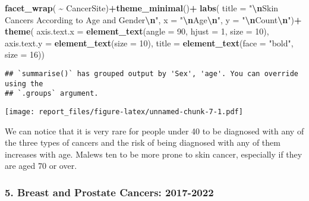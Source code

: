 \documentclass[
]{article}
\newenvironment{Shaded}{\begin{snugshade}}{\end{snugshade}}
\newcommand{\AttributeTok}[1]{\textcolor[rgb]{0.13,0.29,0.53}{#1}}
\newcommand{\DecValTok}[1]{\textcolor[rgb]{0.00,0.00,0.81}{#1}}
\newcommand{\FunctionTok}[1]{\textcolor[rgb]{0.13,0.29,0.53}{\textbf{#1}}}
\newcommand{\NormalTok}[1]{#1}
\newcommand{\SpecialCharTok}[1]{\textcolor[rgb]{0.81,0.36,0.00}{\textbf{#1}}}
\newcommand{\StringTok}[1]{\textcolor[rgb]{0.31,0.60,0.02}{#1}}
\begin{document}
\begin{Shaded}
\begin{Highlighting}[]
  \FunctionTok{facet\_wrap}\NormalTok{( }\SpecialCharTok{\textasciitilde{}}\NormalTok{ CancerSite)}\SpecialCharTok{+}\FunctionTok{theme\_minimal}\NormalTok{()}\SpecialCharTok{+}
  \FunctionTok{labs}\NormalTok{(}
    \AttributeTok{title =} \StringTok{"}\SpecialCharTok{\textbackslash{}n}\StringTok{Skin Cancers According to Age and Gender}\SpecialCharTok{\textbackslash{}n}\StringTok{"}\NormalTok{,}
    \AttributeTok{x =} \StringTok{"}\SpecialCharTok{\textbackslash{}n}\StringTok{Age}\SpecialCharTok{\textbackslash{}n}\StringTok{"}\NormalTok{, }
    \AttributeTok{y =} \StringTok{"}\SpecialCharTok{\textbackslash{}n}\StringTok{Count}\SpecialCharTok{\textbackslash{}n}\StringTok{"}\NormalTok{)}\SpecialCharTok{+}
  \FunctionTok{theme}\NormalTok{(}
    \AttributeTok{axis.text.x =} \FunctionTok{element\_text}\NormalTok{(}\AttributeTok{angle =} \DecValTok{90}\NormalTok{, }\AttributeTok{hjust =} \DecValTok{1}\NormalTok{, }\AttributeTok{size =} \DecValTok{10}\NormalTok{),}
  \AttributeTok{axis.text.y =} \FunctionTok{element\_text}\NormalTok{(}\AttributeTok{size =} \DecValTok{10}\NormalTok{),}
  \AttributeTok{title =} \FunctionTok{element\_text}\NormalTok{(}\AttributeTok{face =} \StringTok{"bold"}\NormalTok{, }\AttributeTok{size =} \DecValTok{16}\NormalTok{))}
\end{Highlighting}
\end{Shaded}

\begin{verbatim}
## `summarise()` has grouped output by 'Sex', 'age'. You can override using the
## `.groups` argument.
\end{verbatim}

\texttt{[image: report\_files/figure-latex/unnamed-chunk-7-1.pdf]}

We can notice that it is very rare for people under 40 to be diagnosed
with any of the three types of cancers and the risk of being diagnosed
with any of them increases with age. Malews ten to be more prone to skin
cancer, especially if they are aged 70 or over.

\hypertarget{breast-and-prostate-cancers-2017-2022}{%
\subsubsection{5. Breast and Prostate Cancers:
2017-2022}\label{breast-and-prostate-cancers-2017-2022}}
\end{document}
